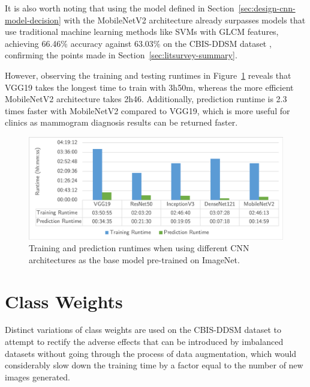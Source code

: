 It is also worth noting  that using the model defined in Section~\ref{sec:design-cnn-model-decision} with the MobileNetV2 architecture already surpasses models that use traditional machine learning methods like SVMs with GLCM features, achieving 66.46\% accuracy against 63.03\% on the CBIS-DDSM dataset \citep{Sarosa2018}, confirming the points made in Section~\ref{sec:litsurvey-summary}. 



However, observing the training and testing runtimes in Figure~\ref{fig:evaluation-CNN_models_experiment-runtimes} reveals that VGG19 takes the longest time to train with 3h50m, whereas the more efficient MobileNetV2 architecture takes 2h46. Additionally, prediction runtime is 2.3 times faster with MobileNetV2 compared to VGG19, which is more useful for clinics as mammogram diagnosis results can be returned faster.

\begin{figure}[h]
\centerline{\includegraphics[width=\textwidth]{figures/evaluation/CNN_models_experiment/runtimes.png}}
\caption{\label{fig:evaluation-CNN_models_experiment-runtimes}Training and prediction runtimes when using different CNN architectures as the base model pre-trained on ImageNet.}
\end{figure}


\section{Class Weights}

Distinct variations of class weights are used on the CBIS-DDSM dataset to attempt to rectify the adverse effects that can be introduced by imbalanced datasets without going through the process of data augmentation, which would considerably slow down the training time by a factor equal to the number of new images generated.\\

